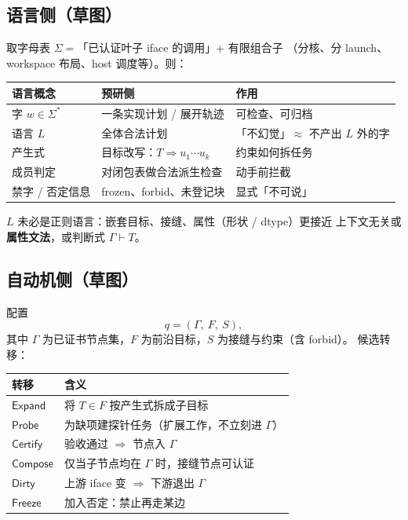 \documentclass[UTF8,a4paper,11pt]{ctexart}
\begin{document}
\subsection{语言侧（草图）}
取字母表 $\Sigma =$「已认证叶子 iface 的调用」+ 有限组合子
（分核、分 launch、workspace 布局、host 调度等）。则：
\begin{table}[h]
  \centering
  \begin{tabular}{@{}L{3.5cm}L{5.5cm}L{5cm}@{}}
    \toprule
    语言概念 & 预研侧 & 作用 \\
    \midrule
    字 $w\in\Sigma^*$ & 一条实现计划 / 展开轨迹 & 可检查、可归档 \\
    语言 $L$ & 全体合法计划 & 「不幻觉」$\approx$ 不产出 $L$ 外的字 \\
    产生式 & 目标改写：$T\Rightarrow u_1\cdots u_k$ & 约束如何拆任务 \\
    成员判定 & 对闭包表做合法派生检查 & 动手前拦截 \\
    禁字 / 否定信息 & frozen、forbid、未登记块 & 显式「不可说」 \\
    \bottomrule
  \end{tabular}
\end{table}

$L$ 未必是正则语言：嵌套目标、接缝、属性（形状 / dtype）更接近
上下文无关或\textbf{属性文法}，或判断式 $\Gamma \vdash T$。

\subsection{自动机侧（草图）}
配置
\[
q = (\Gamma,\ F,\ S),
\]
其中 $\Gamma$ 为已证书节点集，$F$ 为前沿目标，$S$ 为接缝与约束（含 forbid）。
候选转移：
\begin{table}[h]
  \centering
  \begin{tabular}{@{}ll@{}}
    \toprule
    转移 & 含义 \\
    \midrule
    $\mathsf{Expand}$ & 将 $T\in F$ 按产生式拆成子目标 \\
    $\mathsf{Probe}$ & 为缺项建探针任务（扩展工作，不立刻进 $\Gamma$） \\
    $\mathsf{Certify}$ & 验收通过 $\Rightarrow$ 节点入 $\Gamma$ \\
    $\mathsf{Compose}$ & 仅当子节点均在 $\Gamma$ 时，接缝节点可认证 \\
    $\mathsf{Dirty}$ & 上游 iface 变 $\Rightarrow$ 下游退出 $\Gamma$ \\
    $\mathsf{Freeze}$ & 加入否定：禁止再走某边 \\
    \bottomrule
  \end{tabular}
\end{table}
\end{document}
